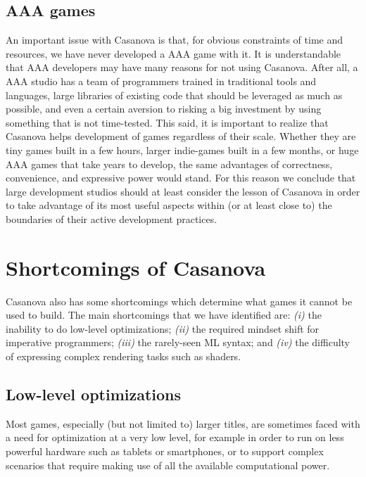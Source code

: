 \subsection{AAA games}
An important issue with Casanova is that, for obvious constraints of time and resources, we have never developed a AAA game with it. It is understandable that AAA developers may have many reasons for not using Casanova. After all, a AAA studio has a team of programmers trained in traditional tools and languages, large libraries of existing code that should be leveraged as much as possible, and even a certain aversion to risking a big investment by using something that is not time-tested. This said, it is important to realize that Casanova helps development of games regardless of their scale. Whether they are tiny games built in a few hours, larger indie-games built in a few months, or huge AAA games that take years to develop, the same advantages of correctness, convenience, and expressive power would stand. For this reason we conclude that large development studios should at least consider the lesson of Casanova in order to take advantage of its most useful aspects within (or at least close to) the boundaries of their active development practices.


\section{Shortcomings of Casanova}
Casanova also has some shortcomings which determine what games it cannot be used to build. The main shortcomings that we have identified are: \textit{(i)} the inability to do low-level optimizations; \textit{(ii)} the required mindset shift for imperative programmers; \textit{(iii)} the rarely-seen ML syntax; and \textit{(iv)} the difficulty of expressing complex rendering tasks such as shaders.

\subsection{Low-level optimizations}
Most games, especially (but not limited to) larger titles, are sometimes faced with a need for optimization at a very low level, for example in order to run on less powerful hardware such as tablets or smartphones, or to support complex scenarios that require making use of all the available computational power.

